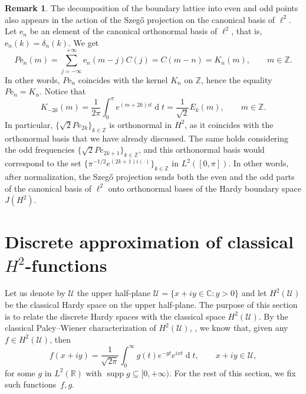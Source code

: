 \documentclass[12pt,a4paper,reqno]{amsart}
\DeclareMathOperator*{\supp}{supp}
\theoremstyle{definition}
\newtheorem{rmk}[thm]{Remark}
\theoremstyle{definition}\newtheorem{defn}[thm]{Definition}
\begin{document}
    
    \begin{rmk}
    The decomposition of the boundary lattice into even and odd points also appears in the action of the Szeg\H{o} projection on the canonical basis of $\ell^2$.  Let $\text{e}_n$ be an element of  the canonical orthonormal basis of $\ell^2$, that is, $\text{e}_n(k)=\delta_n(k).$ We get
    \begin{equation}\label{E:Pe_n=K_n}
        P\text{e}_n(m)=\sum_{j=-\infty}^{+\infty}\text{e}_n(m-j)C(j)=C(m-n)=K_{n}(m), \qquad m\in\mathbb{Z}.
    \end{equation}
    In other words, $P\text{e}_n$ coincides with the kernel $K_n$ on $\mathbb{Z}$, hence the equality $P\text{e}_n=K_n$. Notice that
    \begin{equation}\label{Eq:ONBkernels}
        K_{-2k}(m)=\frac{1}{2\pi}\int_0^\pi e^{(m+2k)it}\operatorname{d}\!t=\frac{1}{\sqrt{2}}E_k(m), \qquad m\in\mathbb{Z}.
    \end{equation}
    In particular, $\{\sqrt 2 P e_{2k}\}_{k\in\mathbb{Z}}$ is orthonormal in $H^2$, as it coincides with the orthonormal basis that we have already discussed. The same holds considering the odd frequencies $\{\sqrt2 P e_{2k+1}\}_{k\in\mathbb{Z}}$, and this orthonormal basis would correspond to the set $\{\pi^{-1/2}e^{(2k+1)i(\cdot)}\}_{k\in\mathbb{Z}}$ in $L^2([0,\pi])$. In other words, after normalization, the Szeg\H{o} projection sends both the even
    and the odd parts of the canonical basis of $\ell^2$ onto orthonormal bases of
    the Hardy boundary space $J(H^2)$.
    \end{rmk} 
     
    \section{Discrete approximation of classical $H^2$-functions}\label{s:approximation}
    
    Let us denote by $\mathcal U$ the upper half-plane $\mathcal U=\{x+iy\in\mathbb C: y> 0\}$ and let $H^2(\mathcal U)$ be the classical Hardy space on the upper half-plane. The purpose of this section is to relate the discrete Hardy spaces with the classical space $H^2(\mathcal U)$. %
    By the classical Paley--Wiener characterization of $H^2(\mathcal U)$, \cite{PW}, we know that, given any $f\in H^2(\mathcal U)$, then
    \begin{equation}\label{Eq:PWhalfplane}
    f(x+iy)=\frac{1}{\sqrt{2\pi}} \int_0^\infty g(t) e^{-yt} e^{ixt}\operatorname{d}\! t, \qquad x+iy\in\mathcal{U},
    \end{equation}
    for some $g$ in $L^2(\mathbb R)$ with $\supp g\subseteq [0,+\infty)$. For the rest of this section, we fix such functions~$f,g$.
    
\end{document}
